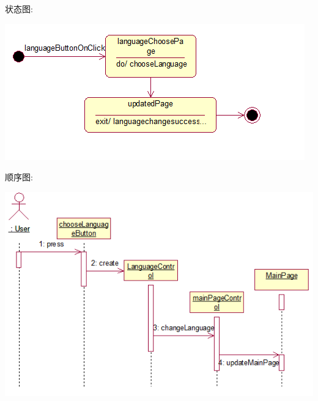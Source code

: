 \documentclass[11pt]{article}
\begin{document}
			状态图: 
			\begin{center}
			\includegraphics[scale=0.42]{选择语言状态图.png}
			\end{center}

			顺序图: 
			\begin{center}
			\includegraphics[scale=0.42]{选择语言顺序图.png}
			\end{center}
\end{document}
